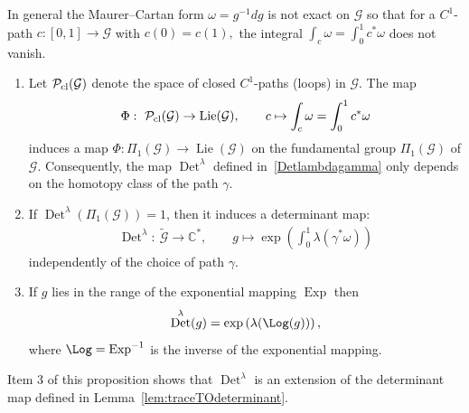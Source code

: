\documentclass[pdftex]{sigma}
\DeclareMathOperator{\Lie}{Lie} \DeclareMathOperator{\Det}{Det}
\DeclareMathOperator{\Exp}{Exp} \DeclareMathOperator{\rk}{rk}
\newcommand{\C}{{\mathbb C}}
\begin{document}
In general the Maurer--Cartan form  $\omega= g^{-1} dg$ is not  exact on ${\mathcal{G}}$ so that for a $C^1$-path $c:[0,1] \to {\mathcal{G}}$ with $c(0)=c(1),$ the integral $\int_c\omega=\int_0^1c^*\omega$ does not vanish.

\begin{proposition}\label{prop:detpath}\qquad
\begin{enumerate}\itemsep=0pt
\item[$1.$] Let ${\mathcal{P}}_{\rm cl}({\mathcal{G}})$ denote the space of closed $C^1$-paths (loops) in ${\mathcal{G}}$. The map
\begin{gather*}
\Phi: \ {\mathcal{P}}_{\rm cl}({\mathcal{G}}) \to \Lie({\mathcal{G}}), \qquad
c \mapsto \int_c\omega=\int_0^1c^*\omega
\end{gather*}
induces a map $\Phi: \Pi_1({\mathcal{G}})\to\Lie({\mathcal{G}})$ on the fundamental group $\Pi_1({\mathcal{G}})$ of ${\mathcal{G}}$. Consequently, the map $\Det^\lambda$ defined in~\eqref{Detlambdagamma} only depends on the homotopy class of the path $\gamma$.
\item[$2.$] If $\Det^\lambda(\Pi_1({\mathcal{G}}))=1$, then it induces a determinant map:
\begin{gather*}
 \Det^\lambda:\ \widetilde{\mathcal{G}} \to \C^*, \qquad
 g \mapsto {\exp}\left(\int_0^1 \lambda(\gamma^*\omega)\right)
\end{gather*}
independently of the choice of path $\gamma$.
\item[$3.$]%
 If $g$ lies in the range of the exponential mapping ${\Exp}$ then
\[
\Det^\lambda(g)= {\exp}\left(\lambda({\Log}(g))\right),
\]
where $ {\Log}= {\Exp}^{-1}$ is the inverse of the exponential mapping.
\end{enumerate}
\end{proposition}

\begin{remark}\label{noteextension}
Item 3 of this proposition shows that $\Det^\lambda$ is an extension of the determinant map def\/ined in Lemma~\ref{lem:traceTOdeterminant}.
\end{remark}
\end{document}
